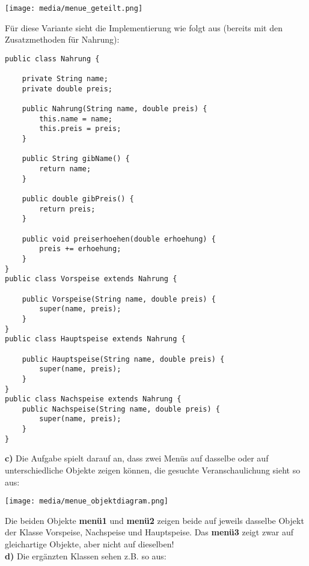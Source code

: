 \documentclass{article}
\begin{document}
\begin{center}
    \texttt{[image: media/menue\_geteilt.png]}
\end{center}
Für diese Variante sieht die Implementierung wie folgt aus (bereits mit den Zusatzmethoden für Nahrung):
\begin{verbatim}
public class Nahrung {
     
    private String name;
    private double preis;
    
    public Nahrung(String name, double preis) {
        this.name = name;
        this.preis = preis;
    }
        
    public String gibName() {
        return name;
    }
    
    public double gibPreis() {
        return preis;
    }
    
    public void preiserhoehen(double erhoehung) {
        preis += erhoehung;
    }
}
public class Vorspeise extends Nahrung {
    
    public Vorspeise(String name, double preis) {
        super(name, preis);
    }
}
public class Hauptspeise extends Nahrung {
    
    public Hauptspeise(String name, double preis) {
        super(name, preis);        
    }
}
public class Nachspeise extends Nahrung { 
    public Nachspeise(String name, double preis) {
        super(name, preis);
    }
}
\end{verbatim}
\textbf{c)} Die Aufgabe spielt darauf an, dass zwei Menüs auf dasselbe oder auf unterschiedliche Objekte zeigen können, die gesuchte Veranschaulichung sieht so aus: 
\begin{center}
    \texttt{[image: media/menue\_objektdiagram.png]}
\end{center}
Die beiden Objekte \textbf{menü1} und \textbf{menü2} zeigen beide auf jeweils dasselbe Objekt der Klasse Vorspeise, Nachspeise und Hauptspeise. Das \textbf{menü3} zeigt zwar auf gleichartige Objekte, aber nicht auf dieselben! \\
\textbf{d)} Die ergänzten Klassen sehen z.B. so aus:
\end{document}
